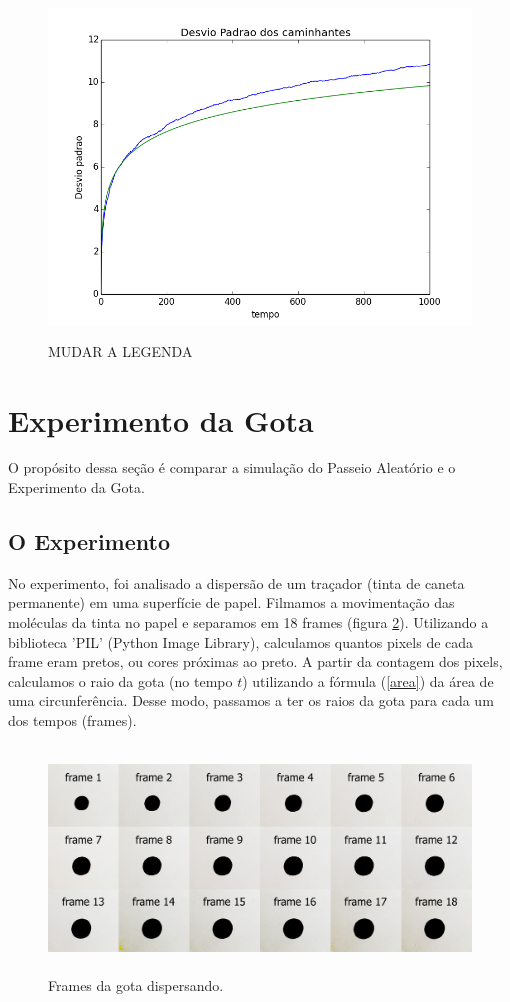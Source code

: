 \documentclass[12pt,a4paper]{article}
\begin{document}
\begin{figure}[H]
\centering
\includegraphics[width=12cm,height=9cm]{imgs/2d/desvio.png}
\caption{MUDAR A LEGENDA}
\label{desvio2}
\end{figure}


\newpage
\section{Experimento da Gota}
O propósito dessa seção é comparar a simulação do Passeio Aleatório e o Experimento da Gota.

\subsection{O Experimento}
No experimento, foi analisado a dispersão de um traçador (tinta de caneta permanente) em uma superfície de papel. Filmamos a movimentação das moléculas da tinta no papel e separamos em 18 frames (figura \ref{frames}). Utilizando a biblioteca 'PIL' (Python Image Library), calculamos quantos pixels de cada frame eram pretos, ou cores próximas ao preto. A partir da contagem dos pixels, calculamos o raio da gota (no tempo $t$) utilizando a fórmula (\ref{area}) da área de uma circunferência. Desse modo, passamos a ter os raios da gota para cada um dos tempos (frames).

\begin{figure}[H]
\centering
\includegraphics[width=13cm,height=6cm]{imgs/frames.jpg}
\caption{Frames da gota dispersando.}
\label{frames}
\end{figure}
\end{document}

